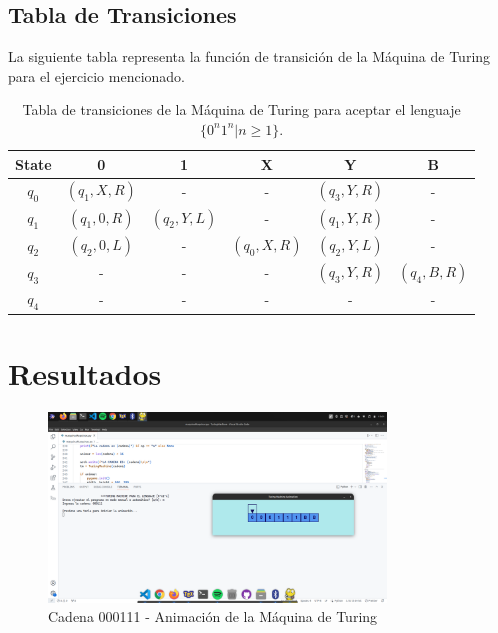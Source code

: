 \documentclass[11pt]{article} %
\begin{document}
	\subsection*{Tabla de Transiciones}
	La siguiente tabla representa la función de transición de la Máquina de Turing para el ejercicio mencionado.
	
	\begin{table}[h]
		\centering
		\begin{tabular}{|c|c|c|c|c|c|}
			\hline
			\textbf{State} & \textbf{0} & \textbf{1} & \textbf{X} & \textbf{Y} & \textbf{B} \\ %
			\hline
			\(q_0\) & \( (q_1, X, R) \) & - & - & \( (q_3, Y, R) \) & - \\
			\(q_1\) & \( (q_1, 0, R) \) & \( (q_2, Y, L) \) & - & \( (q_1, Y, R) \) & - \\
			\(q_2\) & \( (q_2, 0, L) \) & - & \( (q_0, X, R) \) & \( (q_2, Y, L) \) & - \\
			\(q_3\) & - & - & - & \( (q_3, Y, R) \) & \( (q_4, B, R) \) \\
			\(q_4\) & - & - & - & - & - \\
			\hline
		\end{tabular}
		\caption{Tabla de transiciones de la Máquina de Turing para aceptar el lenguaje \(\{0^n1^n | n \geq 1\}\).}
	\end{table}

	
	\newpage
	
	\section{Resultados}
	
	
	\begin{figure}[h]
		\centering
		\includegraphics[width=0.8\textwidth]{manual1}
		\caption{Cadena 000111 - Animación de la Máquina de Turing}
	\end{figure}
	
\end{document}
